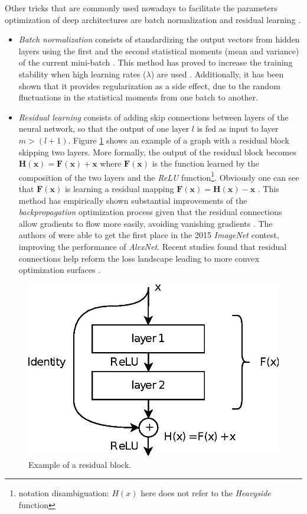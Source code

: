 Other tricks that are commonly used nowadays to facilitate the parameters optimization of deep architectures are batch normalization \autocite{ioffe2015} and residual learning \autocite{kaiming2016}. 
\begin{itemize}
	\item \textit{Batch normalization} consists of standardizing the output vectors from hidden layers using the first and the second statistical moments (mean and variance) of the current mini-batch \autocite{ioffe2015}. This method has proved to increase the training stability when high learning rates ($\lambda$) are used \autocite{Goodfellow2016}. Additionally, it has been shown that it provides regularization \autocite{dauphin2021} as a side effect, due to the random fluctuations in the statistical moments from one batch to another.
	\item \textit{Residual learning} consists of adding skip connections between layers of the neural network, so that the output of one layer $l$ is fed as input to layer $m > (l+1)$. Figure \ref{fig:residual} shows an example of a graph with a residual block skipping two layers. More formally, the output of the residual block becomes $\mathbf{H(x)} = \mathbf{F(x)} + \mathbf{x}$ where $\mathbf{F(x)}$ is the function learned by the composition of the two layers and the \textit{ReLU} function\footnote{notation disambiguation: $H(x)$ here does not refer to the \textit{Heavyside} function}. Obviously one can see that $\mathbf{F(x)}$ is learning a residual mapping $\mathbf{F(x)} = \mathbf{H(x)} - \mathbf{x}$ \autocite{kaiming2016}. This method has empirically shown substantial improvements of the \textit{backpropagation} optimization process given that the residual connections allow gradients to flow more easily, avoiding vanishing gradients \autocite{Goodfellow2016}. The authors of \autocite{kaiming2016} were able to get the first place in the 2015 \textit{ImageNet} contest, improving the performance of \textit{AlexNet}. Recent studies found that residual connections help reform the loss landscape leading to more convex optimization surfaces \autocite{freeman2017, wang2020a}.
\end{itemize}
 


\begin{figure}[h!]
	\centering
	\includegraphics[width=0.5\linewidth]{background/images/residual}
	\caption[Example of a residual block]{Example of a residual block.}
	\label{fig:residual}
\end{figure}


